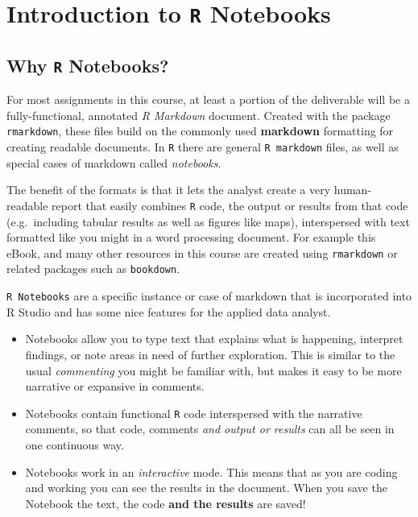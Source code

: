 \documentclass[
]{book}
\providecommand{\tightlist}{%
  \setlength{\itemsep}{0pt}\setlength{\parskip}{0pt}}
\begin{document}
\hypertarget{introduction-to-r-notebooks}{%
\chapter{\texorpdfstring{Introduction to \texttt{R} Notebooks}{Introduction to R Notebooks}}\label{introduction-to-r-notebooks}}

\hypertarget{why-r-notebooks}{%
\section{\texorpdfstring{Why \texttt{R} Notebooks?}{Why R Notebooks?}}\label{why-r-notebooks}}

For most assignments in this course, at least a portion of the deliverable will be a fully-functional, annotated \emph{R Markdown} document. Created with the package \texttt{rmarkdown}, these files build on the commonly used \textbf{markdown} formatting for creating readable documents. In \texttt{R} there are general \texttt{R\ markdown} files, as well as special cases of markdown called \emph{notebooks}.

The benefit of the formats is that it lets the analyst create a very human-readable report that easily combines \texttt{R} code, the output or results from that code (e.g.~including tabular results as well as figures like maps), interspersed with text formatted like you might in a word processing document. For example this eBook, and many other resources in this course are created using \texttt{rmarkdown} or related packages such as \texttt{bookdown}.

\texttt{R\ Notebooks} are a specific instance or case of markdown that is incorporated into R Studio and has some nice features for the applied data analyst.

\begin{itemize}
\tightlist
\item
  Notebooks allow you to type text that explains what is happening, interpret findings, or note areas in need of further exploration. This is similar to the usual \emph{commenting} you might be familiar with, but makes it easy to be more narrative or expansive in comments.
\item
  Notebooks contain functional \texttt{R} code interspersed with the narrative comments, so that code, comments \emph{and output or results} can all be seen in one continuous way.
\item
  Notebooks work in an \emph{interactive} mode. This means that as you are coding and working you can see the results in the document. When you save the Notebook the text, the code \textbf{and the results} are saved!
\end{itemize}
\end{document}
